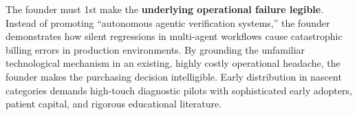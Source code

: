The founder must 1st make the \textbf{underlying operational failure legible}. Instead of promoting ``autonomous agentic verification systems,'' the founder demonstrates how silent regressions in multi-agent workflows cause catastrophic billing errors in production environments. By grounding the unfamiliar technological mechanism in an existing, highly costly operational headache, the founder makes the purchasing decision intelligible. Early distribution in nascent categories demands high-touch diagnostic pilots with sophisticated early adopters, patient capital, and rigorous educational literature.
